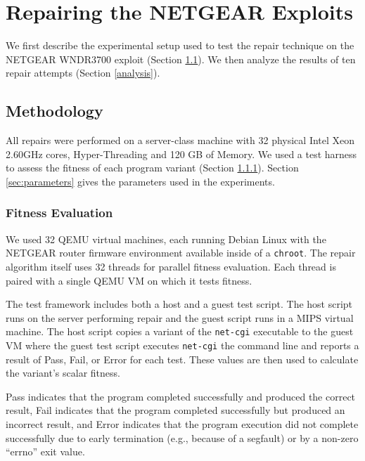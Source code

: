 \documentclass{sigcomm-alternate}
\begin{document}
\section{Repairing the NETGEAR Exploits}
\label{repair-demonstration}

We first describe the experimental setup used to test the
repair technique on the NETGEAR WNDR3700 exploit (Section
\ref{methodology}).  We then analyze the results of ten repair
attempts (Section \ref{analysis}).

\subsection{Methodology}
\label{methodology}
All repairs were performed on a server-class machine with
32 physical Intel Xeon 2.60GHz cores, Hyper-Threading and 120 GB of
Memory. We used a test harness to assess the fitness
of each program variant (Section
\ref{fitness-evaluation}). Section \ref{sec:parameters} gives the parameters used in the experiments.

\subsubsection{Fitness Evaluation}
\label{fitness-evaluation}
We used 32 QEMU virtual machines, each
running Debian Linux with the NETGEAR router firmware environment
available inside of a \texttt{chroot}.  The repair algorithm itself
uses 32 threads for parallel fitness evaluation.  Each thread is
paired with a single QEMU VM on which it tests fitness.

The test framework includes both a host and a guest test script.  The
host script runs on the server performing repair and the guest script
runs in a MIPS virtual machine.  The host script copies a
variant of the \texttt{net-cgi} executable to the guest VM where the
guest test script executes \texttt{net-cgi} the command line and
reports a result of {\sc Pass}, {\sc Fail}, or {\sc Error} for each
test.  These values are then used to calculate the variant's scalar
fitness.

{\sc Pass} indicates that the program completed successfully and
produced the correct result, {\sc Fail} indicates that the program
completed successfully but produced an incorrect result, and {\sc
  Error} indicates that the program execution did not complete
successfully due to early termination (e.g., because of a segfault) or
by a non-zero ``errno'' exit value.
\end{document}
